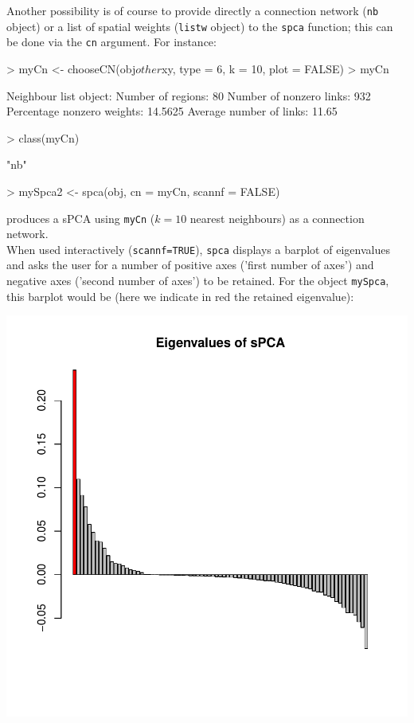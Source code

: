 \documentclass{article}
\begin{document}
Another possibility is of course to provide directly a connection
network (\texttt{nb} object) or a list of spatial weights
(\texttt{listw} object) to the \texttt{spca} function; this can be done via the \texttt{cn} argument.
For instance:
\begin{Schunk}
\begin{Sinput}
> myCn <- chooseCN(obj$other$xy, type = 6, k = 10, plot = FALSE)
> myCn
\end{Sinput}
\begin{Soutput}
Neighbour list object:
Number of regions: 80 
Number of nonzero links: 932 
Percentage nonzero weights: 14.5625 
Average number of links: 11.65 
\end{Soutput}
\begin{Sinput}
> class(myCn)
\end{Sinput}
\begin{Soutput}
[1] "nb"
\end{Soutput}
\begin{Sinput}
> mySpca2 <- spca(obj, cn = myCn, scannf = FALSE)
\end{Sinput}
\end{Schunk}
\noindent produces a sPCA using \texttt{myCn} ($k=10$ nearest
neighbours) as a connection network.
\\


When used interactively (\texttt{scannf=TRUE}), \texttt{spca} displays a barplot of eigenvalues and
asks the user for a number of positive axes ('first number of axes') and negative
axes ('second number of axes') to be retained.
For the object \texttt{mySpca}, this barplot would be (here we
indicate in red the retained eigenvalue):
\begin{Schunk}
\end{Schunk}
\includegraphics{figs/spca-008}
\end{document}
